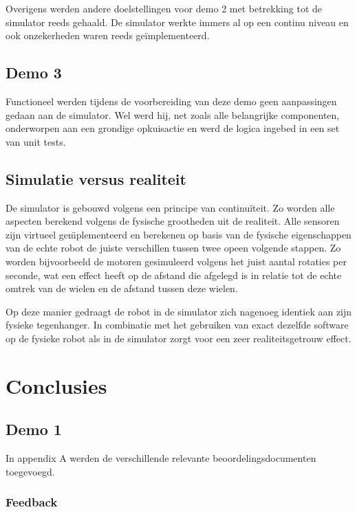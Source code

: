 \documentclass[12pt,a4paper]{report}
\begin{document}
Overigens werden andere doelstellingen voor demo 2 met betrekking tot de simulator reeds gehaald. De simulator werkte immers al op een continu niveau en ook onzekerheden waren reeds ge\"implementeerd.

\section{Demo 3}

Functioneel werden tijdens de voorbereiding van deze demo geen aanpassingen gedaan aan de simulator. Wel werd hij, net zoals alle belangrijke componenten, onderworpen aan een grondige opkuisactie en werd de logica ingebed in een set van unit tests.

\section{Simulatie versus realiteit}

De simulator is gebouwd volgens een principe van continu\"iteit. Zo worden alle aspecten berekend volgens de fysische grootheden uit de realiteit. Alle sensoren zijn virtueel ge\"mplementeerd en berekenen op basis van de fysische eigenschappen van de echte robot de juiste verschillen tussen twee opeen volgende stappen. Zo worden bijvoorbeeld de motoren gesimuleerd volgens het juist aantal rotaties per seconde, wat een effect heeft op de afstand die afgelegd is in relatie tot de echte omtrek van de wielen en de afstand tussen deze wielen.

Op deze manier gedraagt de robot in de simulator zich nagenoeg identiek aan zijn fysieke tegenhanger. In combinatie met het gebruiken van exact dezelfde software op de fysieke robot als in de simulator zorgt voor een zeer realiteitsgetrouw effect.

\chapter{Conclusies}

\section{Demo 1}

In appendix A werden de verschillende relevante beoordelingsdocumenten toegevoegd.

\subsection{Feedback}
\end{document}
